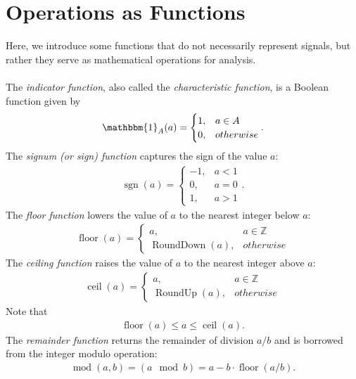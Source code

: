 \documentclass{report}
\begin{document}
\section*{Operations as Functions}
Here, we introduce some functions that do not necessarily represent signals, but rather they serve as mathematical operations for analysis. 
\\ \\
The \emph{indicator function}, also called the \emph{characteristic function}, is a Boolean function given by 
\begin{align}
    \mathbbm{1}_A(a) = 
    \begin{cases}
        1, & a\in A \\
        0, & otherwise
    \end{cases}.
\end{align}
The \emph{signum (or sign) function} captures the sign of the value $a$: 
\begin{align}
    \operatorname{sgn}(a) = 
    \begin{cases}
        -1, & a<1 \\
        0, & a=0 \\
        1, & a>1
    \end{cases}.
\end{align}
The \emph{floor function} lowers the value of $a$ to the nearest integer below $a$:
\begin{align}
    \operatorname{floor}(a) = 
    \begin{cases}
        a, & a\in \mathbb{Z} \\
        \operatorname{RoundDown}(a), & otherwise
    \end{cases}
\end{align}
The \emph{ceiling function} raises the value of $a$ to the nearest integer above $a$:
\begin{align}
    \operatorname{ceil}(a) = 
    \begin{cases}
        a, & a\in \mathbb{Z} \\
        \operatorname{RoundUp}(a), & otherwise
    \end{cases}
\end{align}
Note that 
\begin{align}
    \operatorname{floor}(a) \leq a \leq \operatorname{ceil}(a).
\end{align}
The \emph{remainder function} returns the remainder of division $a/b$ and is borrowed from the integer modulo operation:
\begin{align}
    \operatorname{mod}(a,b) = (a \mod b) = a - b\cdot\operatorname{floor}(a/b).
\end{align}
\end{document}
